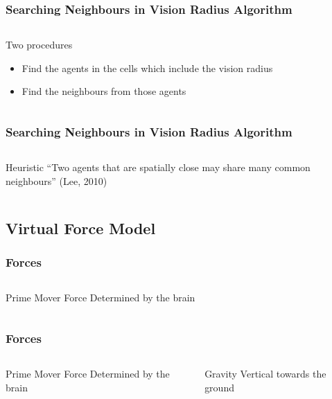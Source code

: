 \documentclass{beamer}
\begin{document}
\begin{frame}
\frametitle{Searching Neighbours in Vision Radius Algorithm}
\begin{center}
\begin{columns}
	\column{4cm}
	\column{4cm}
	\begin{block}{Two procedures}
	\begin{itemize}
	\item Find the agents in the cells which
	include the vision radius
	\item Find the neighbours from those agents
	\end{itemize}
	\end{block}
\end{columns}
\end{center}
\end{frame}

\begin{frame}
\frametitle{Searching Neighbours in Vision Radius Algorithm}
\begin{center}
\begin{columns}
	\column{4cm}
	\column{4cm}
	\begin{block}{Heuristic}
	``Two agents that are spatially close 
	 may share many common neighbours'' (Lee, 2010)
	\end{block}
\end{columns}
\end{center}
\end{frame}

\subsection{Virtual Force Model}

\begin{frame}
\frametitle{Forces}
\begin{center}
\begin{columns}
	\column{4cm}
	\column{4cm}
	\begin{exampleblock}{Prime Mover Force}
		Determined by the brain
	\end{exampleblock}
\end{columns}
\end{center}
\end{frame}

\begin{frame}
\frametitle{Forces}
\begin{center}
\begin{columns}
	\column{4cm}
	\column{4cm}
	\begin{exampleblock}{Prime Mover Force}
		Determined by the brain
	\end{exampleblock}
	\begin{block}{Gravity}
		Vertical towards the ground
	\end{block}
\end{columns}
\end{center}
\end{frame}
\end{document}
